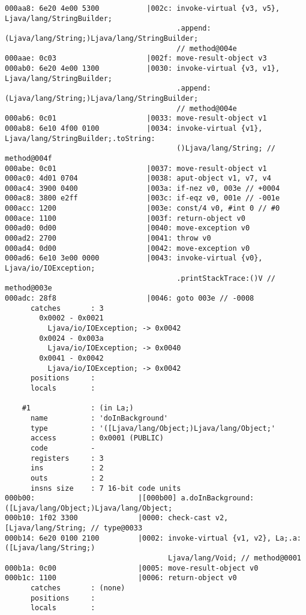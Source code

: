 \begin{lstlisting}
000aa8: 6e20 4e00 5300           |002c: invoke-virtual {v3, v5}, Ljava/lang/StringBuilder;
                                        .append:(Ljava/lang/String;)Ljava/lang/StringBuilder;
                                        // method@004e
000aae: 0c03                     |002f: move-result-object v3
000ab0: 6e20 4e00 1300           |0030: invoke-virtual {v3, v1}, Ljava/lang/StringBuilder;
                                        .append:(Ljava/lang/String;)Ljava/lang/StringBuilder;
                                        // method@004e
000ab6: 0c01                     |0033: move-result-object v1
000ab8: 6e10 4f00 0100           |0034: invoke-virtual {v1}, Ljava/lang/StringBuilder;.toString:
                                        ()Ljava/lang/String; // method@004f
000abe: 0c01                     |0037: move-result-object v1
000ac0: 4d01 0704                |0038: aput-object v1, v7, v4
000ac4: 3900 0400                |003a: if-nez v0, 003e // +0004
000ac8: 3800 e2ff                |003c: if-eqz v0, 001e // -001e
000acc: 1200                     |003e: const/4 v0, #int 0 // #0
000ace: 1100                     |003f: return-object v0
000ad0: 0d00                     |0040: move-exception v0
000ad2: 2700                     |0041: throw v0
000ad4: 0d00                     |0042: move-exception v0
000ad6: 6e10 3e00 0000           |0043: invoke-virtual {v0}, Ljava/io/IOException;
                                        .printStackTrace:()V // method@003e
000adc: 28f8                     |0046: goto 003e // -0008
      catches       : 3
        0x0002 - 0x0021
          Ljava/io/IOException; -> 0x0042
        0x0024 - 0x003a
          Ljava/io/IOException; -> 0x0040
        0x0041 - 0x0042
          Ljava/io/IOException; -> 0x0042
      positions     :
      locals        :

    #1              : (in La;)
      name          : 'doInBackground'
      type          : '([Ljava/lang/Object;)Ljava/lang/Object;'
      access        : 0x0001 (PUBLIC)
      code          -
      registers     : 3
      ins           : 2
      outs          : 2
      insns size    : 7 16-bit code units
000b00:                        |[000b00] a.doInBackground:([Ljava/lang/Object;)Ljava/lang/Object;
000b10: 1f02 3300              |0000: check-cast v2, [Ljava/lang/String; // type@0033
000b14: 6e20 0100 2100         |0002: invoke-virtual {v1, v2}, La;.a:([Ljava/lang/String;)
                                      Ljava/lang/Void; // method@0001
000b1a: 0c00                   |0005: move-result-object v0
000b1c: 1100                   |0006: return-object v0
      catches       : (none)
      positions     :
      locals        :


\end{lstlisting}
